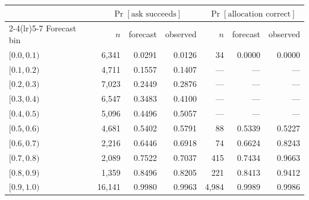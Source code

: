 \begin{tabular}{lrrrrrr}
\toprule
& \multicolumn{3}{c}{$\Pr[\text{ask succeeds}]$} & \multicolumn{3}{c}{$\Pr[\text{allocation correct}]$} \\
\cmidrule(lr){2-4}\cmidrule(lr){5-7}
Forecast bin & $n$ & forecast & observed & $n$ & forecast & observed \\
\midrule
$[0.0, 0.1)$ & 6{,}341 & 0.0291 & 0.0126 & 34 & 0.0000 & 0.0000 \\
$[0.1, 0.2)$ & 4{,}711 & 0.1557 & 0.1407 & --- & --- & --- \\
$[0.2, 0.3)$ & 7{,}023 & 0.2449 & 0.2876 & --- & --- & --- \\
$[0.3, 0.4)$ & 6{,}547 & 0.3483 & 0.4100 & --- & --- & --- \\
$[0.4, 0.5)$ & 5{,}096 & 0.4496 & 0.5057 & --- & --- & --- \\
$[0.5, 0.6)$ & 4{,}681 & 0.5402 & 0.5791 & 88 & 0.5339 & 0.5227 \\
$[0.6, 0.7)$ & 2{,}216 & 0.6446 & 0.6918 & 74 & 0.6624 & 0.8243 \\
$[0.7, 0.8)$ & 2{,}089 & 0.7522 & 0.7037 & 415 & 0.7434 & 0.9663 \\
$[0.8, 0.9)$ & 1{,}359 & 0.8496 & 0.8205 & 221 & 0.8413 & 0.9412 \\
$[0.9, 1.0)$ & 16{,}141 & 0.9980 & 0.9963 & 4{,}984 & 0.9989 & 0.9986 \\
\bottomrule
\end{tabular}